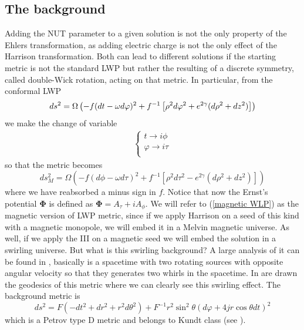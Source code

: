 \subsection{The background} \label{sub sezione swirling background}
Adding the NUT parameter to a given solution is not the only property of the Ehlers transformation, as adding electric charge is not the only effect of the Harrison transformation. Both can lead to different solutions if the starting metric is not the standard LWP but rather the resulting of a discrete symmetry, called
double-Wick rotation, acting on that metric. In particular, from the conformal LWP 
\begin{equation}
        ds^2 = \Omega\left(-f(dt - \omega d\varphi)^2 + f^{-1}\left[ \rho^2 d\varphi^2 + e^{2\gamma}(d\rho^2+dz^2)\right] \right)
        \notag
\end{equation}
we make the change of variable 
\begin{equation*}
    \begin{aligned}
        \begin{cases}
           t \rightarrow i\phi \\
           \varphi \rightarrow i\tau \\
        \end{cases}
    \end{aligned}
    \label{Double Wick rotation}
\end{equation*}
so that the metric becomes
\begin{equation}
        ds_M^2 = \Omega\left(-f(d\phi - \omega d\tau)^2 + f^{-1}\left[ \rho^2 d\tau^2 - e^{2\gamma}(d\rho^2+dz^2)\right] \right)
        \label{magnetic WLP}
\end{equation}
where we have reabsorbed a minus sign in $f$. Notice that now the Ernst's potential $\boldsymbol{\Phi}$ is defined as $\boldsymbol{\Phi} = A_{\tau}+iA_{\phi}$. We will refer to (\ref{magnetic WLP}) as the magnetic version of LWP metric, since if we apply Harrison on a seed of this kind with a magnetic monopole, we will embed it in a Melvin magnetic universe. As well, if we apply the III on a magnetic seed we will embed the solution in a swirling universe. But what is this swirling background? A large analysis of it  can be found in \citep{Astorino-Martelli}, basically is a spacetime with two rotating sources with opposite angular velocity so that they generates two whirls in the spacetime. In \citep{Astorino-Martelli} are drawn the geodesics of this metric where we can clearly see this swirling effect. The background metric is
\begin{equation}
    ds^2 = F(-dt^2+dr^2+r^2d\theta^2)+F^{-1}r^2\sin^2\theta(d\varphi+4jr\cos\theta dt)^2
    \label{swirling background}
\end{equation}
which is a Petrov type D metric and belongs to Kundt class (see \citep{stephani_GR}).


